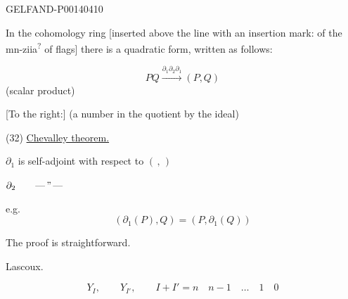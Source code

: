 \begin{GelfandAdjacentEvidence}{GELFAND-P001404}{10}



In the cohomology ring
[inserted above the line with an insertion mark: of the mn-ziia\textsuperscript{?} of flags]
there is a quadratic form, written as follows:

\end{GelfandAdjacentEvidence}



\begin{equation*}
PQ\xrightarrow{\partial_1\partial_2\partial_1}(P,Q) \tag{31}
\end{equation*}
(scalar product)

[To the right:] (a number in the quotient by the ideal)

(32) \uline{Chevalley theorem.}

\(\partial_1\) is self-adjoint with respect to \((\, , \,)\)

\(\partial_2\qquad\text{—\,''\,—}\)

e.g.
\begin{equation*}
(\partial_1(P),Q)=(P,\partial_1(Q)) \tag{33}
\end{equation*}

The proof is straightforward.

Lascoux.

\begin{equation*}
Y_I,\qquad Y_{I'},\qquad I+I'=n\quad n-1\quad\dots\quad1\quad0 \tag{34}
\end{equation*}


